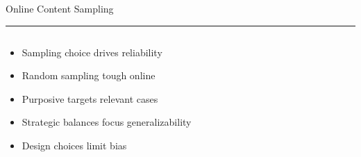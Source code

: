 \documentclass[aspectratio=169]{beamer}
\newcommand{\TitleFont}{\rmfamily}
\begin{document}
\begin{frame}[t]{}
  \vspace*{0.5cm}
  {\TitleFont\fontsize{18}{22}\selectfont\color{LUBronze}Online Content Sampling\par}
  \vspace{0.3em}
  {\color{LUBronze}\rule{\linewidth}{0.8pt}}\par
  \vspace{0.2cm}
  \begin{columns}[t]
    \begin{column}[t]{0.45\textwidth}
      \vspace*{0pt}
      \begin{itemize}\setlength\itemsep{0.65em}
        \item Sampling choice drives reliability
        \item Random sampling tough online
        \item Purposive targets relevant cases
        \item Strategic balances focus generalizability
        \item Design choices limit bias
      \end{itemize}
    \end{column}
  \end{columns}
\end{frame}
\end{document}
